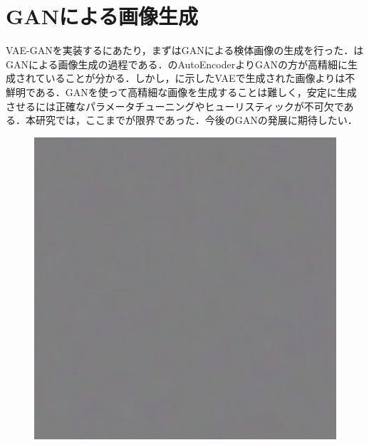 \section{GANによる画像生成}
VAE-GANを実装するにあたり，まずはGANによる検体画像の生成を行った．はGANによる画像生成の過程である．のAutoEncoderよりGANの方が高精細に生成されていることが分かる．しかし，に示したVAEで生成された画像よりは不鮮明である．GANを使って高精細な画像を生成することは難しく，安定に生成させるには正確なパラメータチューニングやヒューリスティックが不可欠である．本研究では，ここまでが限界であった．今後のGANの発展に期待したい．

\begin{figure}[H]
	\centering
	
	\begin{minipage}{0.24\columnwidth}
		\centering
		\includegraphics[clip, width=\linewidth]{fig/generative_adversarial_nets/0000_0000}
		\label{fig:}
	\end{minipage}
	\begin{minipage}{0.24\columnwidth}
		\centering

\end{minipage}
\end{figure}
